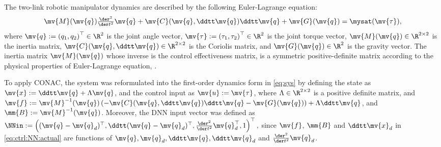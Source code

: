 \documentclass[letterpaper, journal]{IEEEtran}
\begin{document}
The two-link robotic manipulator dynamics are described by the following Euler-Lagrange equation:
\begin{equation} \label{eq:robot:dynamics}
  \mv{M}(\mv{q})\tfrac{\der^2}{\der t^2}{\mv{q}}
  +
  \mv{C}(\mv{q},\ddtt\mv{q})\ddtt\mv{q}
  +
  \mv{G}(\mv{q})
  =
  \mysat
  (
    \mv{\tau}
  )
  ,
\end{equation}
where $\mv{q} := \left(q_1,q_2\right)^\top \in \R^2$ is the joint angle vector, $\mv{\tau} := \left(\tau_1,\tau_2\right)^\top \in \R^2$ is the joint torque vector, $\mv{M}(\mv{q}) \in \R^{2\times2}$ is the inertia matrix, $\mv{C}(\mv{q},\ddtt\mv{q}) \in \R^{2\times2}$ is the Coriolis matrix, and $\mv{G}(\mv{q}) \in \R^2$ is the gravity vector.
The inertia matrix $\mv{M}(\mv{q})$ whose inverse is the control effectiveness matrix, is a symmetric positive-definite matrix according to the physical properties of Euler-Lagrange equation, \cite[Lemma 3.1]{Ji:2025aa}.

To apply CONAC, the system was reformulated into the first-order dynamics form in \eqref{eq:sys} by defining the state as $\mv{x} := \ddtt\mv{q}+\Lambda\mv{q}$, and the control input as $\mv{u} := \mv{\tau}$, where $\Lambda\in\R^{2\times2}$ is a positive definite matrix, and $\mv{f}:=\mv{M}^{-1}(\mv{q})\left(-\mv{C}(\mv{q},\ddtt\mv{q})\ddtt\mv{q}-\mv{G}(\mv{q})\right)+\Lambda\ddtt\mv{q}$, and $\mm{B}:=\mv{M}^{-1}(\mv{q})$.
Moreover, the DNN input vector was defined as 
$
  \NNin 
  := 
  \left(
    (\mv{q}-\mv{q}_d)^\top
    ,
    \ddtt(\mv{q}-\mv{q}_d)^\top
    ,
    \tfrac{\der^2}{\der t^2}\mv{q}_d^\top
    ,
    1
  \right)^\top
  ,
$
since $\mv{f}$, $\mm{B}$ and $\ddtt\mv{x}_d$ in \eqref{eq:ctrl:NN:actual} are functions of $\mv{q},\mv{q}_d,\ddtt\mv{q},\ddtt\mv{q}_d$ and $\tfrac{\der^2}{\der t^2}\mv{q}_d$.
\end{document}
